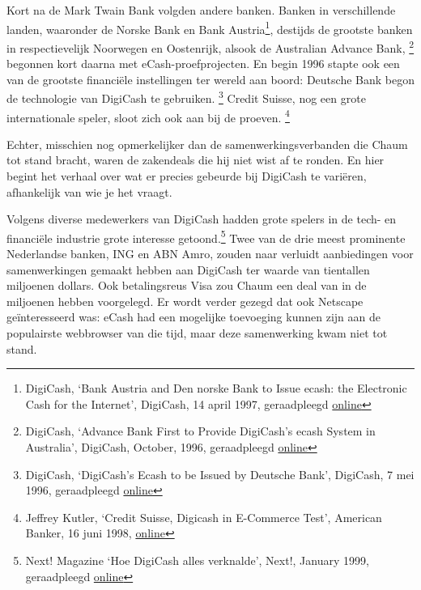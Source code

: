 \documentclass[
  a5paper,
  smalldemyvopaper,11pt,twoside,onecolumn,openright,extrafontsizes]{memoir}
\begin{document}
Kort na de Mark Twain Bank volgden andere banken. Banken in
verschillende landen, waaronder de Norske Bank en Bank
Austria\footnote{DigiCash, `Bank Austria and Den norske Bank to Issue
  ecash: the Electronic Cash for the Internet', DigiCash, 14 april 1997,
  geraadpleegd
  \href{https://web.archive.org/web/19970605025912/http://www.digicash.com:80/publish/ec_pres8.html}{online}},
destijds de grootste banken in respectievelijk Noorwegen en Oostenrijk,
alsook de Australian Advance Bank, \footnote{DigiCash, `Advance Bank
  First to Provide DigiCash's ecash System in Australia', DigiCash,
  October, 1996, geraadpleegd
  \href{https://web.archive.org/web/19961102121407/https://www.digicash.com/publish/ec_pres6.html}{online}}
begonnen kort daarna met eCash-proefprojecten. En begin 1996 stapte ook
een van de grootste financiële instellingen ter wereld aan boord:
Deutsche Bank begon de technologie van DigiCash te gebruiken.
\footnote{DigiCash, `DigiCash's Ecash to be Issued by Deutsche Bank',
  DigiCash, 7 mei 1996, geraadpleegd
  \href{https://web.archive.org/web/19961102121355/https://www.digicash.com/publish/ec_pres5.html}{online}}
Credit Suisse, nog een grote internationale speler, sloot zich ook aan
bij de proeven. \footnote{Jeffrey Kutler, `Credit Suisse, Digicash in
  E-Commerce Test', American Banker, 16 juni 1998,
  \href{https://www.americanbanker.com/news/credit-suisse-digicash-in-e-commerce-test}{online}}

Echter, misschien nog opmerkelijker dan de samenwerkingsverbanden die
Chaum tot stand bracht, waren de zakendeals die hij niet wist af te
ronden. En hier begint het verhaal over wat er precies gebeurde bij
DigiCash te variëren, afhankelijk van wie je het vraagt.

Volgens diverse medewerkers van DigiCash hadden grote spelers in de
tech- en financiële industrie grote interesse getoond.\footnote{Next!
  Magazine `Hoe DigiCash alles verknalde', Next!, January 1999,
  geraadpleegd
  \href{https://web.archive.org/web/19990427142412/https://www.nextmagazine.nl/ecash.htm}{online}}
Twee van de drie meest prominente Nederlandse banken, ING en ABN Amro,
zouden naar verluidt aanbiedingen voor samenwerkingen gemaakt hebben aan
DigiCash ter waarde van tientallen miljoenen dollars. Ook betalingsreus
Visa zou Chaum een deal van in de miljoenen hebben voorgelegd. Er wordt
verder gezegd dat ook Netscape geïnteresseerd was: eCash had een
mogelijke toevoeging kunnen zijn aan de populairste webbrowser van die
tijd, maar deze samenwerking kwam niet tot stand.
\end{document}
